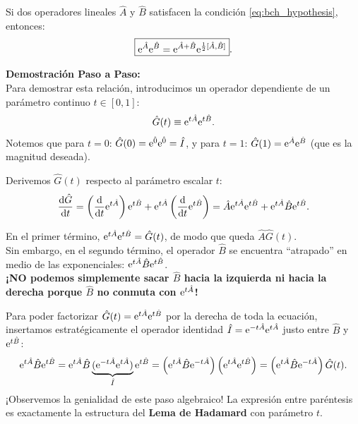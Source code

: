 \begin{teoremabox}
    Si dos operadores lineales $\hat{A}$ y $\hat{B}$ satisfacen la condición \eqref{eq:bch_hypothesis}, entonces:
    \begin{equation}
        \boxed{\mathrm{e}^{\hat{A}}\mathrm{e}^{\hat{B}} = \mathrm{e}^{\hat{A}+\hat{B}}\mathrm{e}^{\frac{1}{2}[\hat{A}, \hat{B}]}}.
        \label{eq:bch_simplified}
    \end{equation}
\end{teoremabox}

\textbf{Demostración Paso a Paso:}\\
Para demostrar esta relación, introducimos un operador dependiente de un parámetro continuo $t \in [0, 1]$:
\begin{equation}
    \hat{G}(t) \equiv \mathrm{e}^{t\hat{A}}\mathrm{e}^{t\hat{B}}.
    \label{eq:g_ansatz}
\end{equation}
Notemos que para $t = 0$: $\hat{G}(0) = \mathrm{e}^{\hat{0}}\mathrm{e}^{\hat{0}} = \hat{I}$, y para $t = 1$: $\hat{G}(1) = \mathrm{e}^{\hat{A}}\mathrm{e}^{\hat{B}}$ (que es la magnitud deseada).

Derivemos $\hat{G}(t)$ respecto al parámetro escalar $t$:
\begin{equation}
    \frac{\mathrm{d}\hat{G}}{\mathrm{d} t} = \left(\frac{\mathrm{d}}{\mathrm{d} t}\mathrm{e}^{t\hat{A}}\right)\mathrm{e}^{t\hat{B}} + \mathrm{e}^{t\hat{A}}\left(\frac{\mathrm{d}}{\mathrm{d} t}\mathrm{e}^{t\hat{B}}\right) = \hat{A}\mathrm{e}^{t\hat{A}}\mathrm{e}^{t\hat{B}} + \mathrm{e}^{t\hat{A}}\hat{B}\mathrm{e}^{t\hat{B}}.
\end{equation}

\begin{alertabox}
    En el primer término, $\mathrm{e}^{t\hat{A}}\mathrm{e}^{t\hat{B}} = \hat{G}(t)$, de modo que queda $\hat{A}\hat{G}(t)$.\\
    Sin embargo, en el segundo término, el operador $\hat{B}$ se encuentra \enquote{atrapado} en medio de las exponenciales: $\mathrm{e}^{t\hat{A}}\hat{B}\mathrm{e}^{t\hat{B}}$.\\
    \textbf{¡NO podemos simplemente sacar $\hat{B}$ hacia la izquierda ni hacia la derecha porque $\hat{B}$ no conmuta con $\mathrm{e}^{t\hat{A}}$!}
    
    Para poder factorizar $\hat{G}(t) = \mathrm{e}^{t\hat{A}}\mathrm{e}^{t\hat{B}}$ por la derecha de toda la ecuación, insertamos estratégicamente el operador identidad $\hat{I} = \mathrm{e}^{-t\hat{A}}\mathrm{e}^{t\hat{A}}$ justo entre $\hat{B}$ y $\mathrm{e}^{t\hat{B}}$:
    \begin{equation}
        \mathrm{e}^{t\hat{A}}\hat{B}\mathrm{e}^{t\hat{B}} = \mathrm{e}^{t\hat{A}}\hat{B}\underbrace{(\mathrm{e}^{-t\hat{A}}\mathrm{e}^{t\hat{A}})}_{\hat{I}}\mathrm{e}^{t\hat{B}} = \left(\mathrm{e}^{t\hat{A}}\hat{B}\mathrm{e}^{-t\hat{A}}\right)\left(\mathrm{e}^{t\hat{A}}\mathrm{e}^{t\hat{B}}\right) = \left(\mathrm{e}^{t\hat{A}}\hat{B}\mathrm{e}^{-t\hat{A}}\right)\hat{G}(t).
    \end{equation}
    ¡Observemos la genialidad de este paso algebraico! La expresión entre paréntesis es exactamente la estructura del \textbf{Lema de Hadamard} con parámetro $t$.
\end{alertabox}

